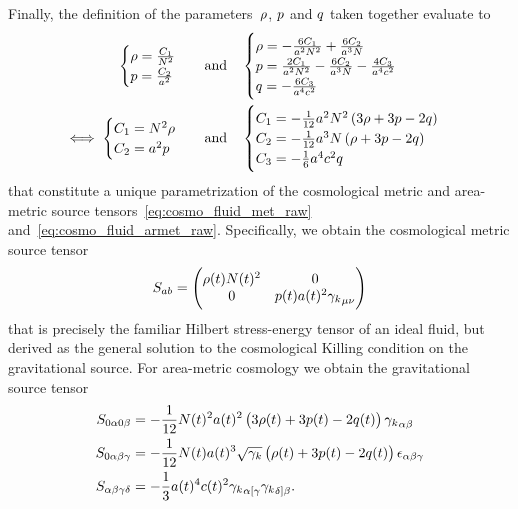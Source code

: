 
Finally, the definition of the parameters~$\rho$, $p$ and $q$ taken together evaluate to
\begin{align}
	\begin{cases}
		\rho=\frac{C_1}{N^2}\\
		p=\frac{C_2}{a^2}
	\end{cases} \quad &\text{and} \quad \begin{cases}
		\rho=-\frac{6C_1}{a^2N^2}+\frac{6C_2}{a^3N}\\
		p=\frac{2C_1}{a^2N^2}-\frac{6C_2}{a^3N}-\frac{4C_3}{a^4c^2}\\
		q=-\frac{6C_3}{a^4c^2}
	\end{cases}\\
	\iff \begin{cases}
		C_1=N^2\rho\\
		C_2=a^2p
	\end{cases} \quad &\text{and} \quad \begin{cases}
		C_1=-\frac{1}{12}a^2N^2\left(3\rho+3p-2q\right)\\
		C_2=-\frac{1}{12}a^3N\left(\rho+3p-2q\right)\\
		C_3=-\frac{1}{6}a^4c^2q
	\end{cases}
\end{align}
that constitute a unique parametrization of the cosmological metric and area-metric source tensors~\eqref{eq:cosmo_fluid_met_raw} and~\eqref{eq:cosmo_fluid_armet_raw}. Specifically, we obtain the cosmological metric source tensor
\begin{align}\label{eq:sourcet_fluid_met}
	S_{ab}=\begin{pmatrix}
		\rho(t)N(t)^2 & 0\\
		0 & p(t)a(t)^2{\gamma_{k}}_{\mu\nu}
	\end{pmatrix}
\end{align}
that is precisely the familiar Hilbert stress-energy tensor of an ideal fluid, but derived as the general solution to the cosmological Killing condition on the gravitational source. For area-metric cosmology we obtain the gravitational source tensor
\begin{align}\label{eq:sourcet_fluid_armet}
	\begin{split}	
		S_{0\alpha 0\beta}&=-\frac{1}{12}N(t)^2a(t)^2\left(3\rho(t)+3p(t)-2q(t)\right){\gamma_{k}}_{\alpha\beta}\\
		S_{0\alpha\beta\gamma}&=-\frac{1}{12}N(t)a(t)^3\sqrt{{\gamma_{k}}} \left(\rho(t)+3p(t)-2q(t)\right)\epsilon_{\alpha\beta\gamma}\\
		S_{\alpha\beta\gamma\delta}&=-\frac{1}{3}a(t)^4c(t)^2{\gamma_{k}}_{\alpha[\gamma}{\gamma_{k}}_{\delta]\beta}
		\mathpunct{.}
	\end{split}
\end{align}

